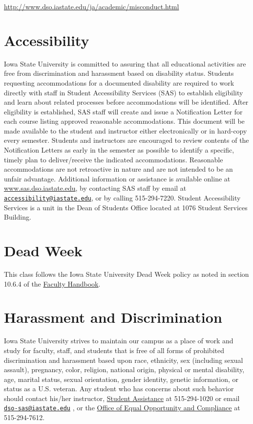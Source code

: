 \documentclass{article}
\begin{document}
\url{http://www.dso.iastate.edu/ja/academic/misconduct.html}

\section{Accessibility}
Iowa State University is committed to assuring that all educational activities
are free from discrimination and harassment based on disability status.
Students requesting accommodations for a documented disability are required to
work directly with staff in Student Accessibility Services (SAS) to establish
eligibility and learn about related processes before accommodations will be
identified.  After eligibility is established, SAS staff will create and issue
a Notification Letter for each course listing approved reasonable
accommodations.  This document will be made available to the student and
instructor either electronically or in hard-copy every semester.  Students and
instructors are encouraged to review contents of the Notification Letters as
early in the semester as possible to identify a specific, timely plan to
deliver/receive the indicated accommodations. Reasonable accommodations are not
retroactive in nature and are not intended to be an unfair advantage.
Additional information or assistance is available online at
\url{www.sas.dso.iastate.edu}, by contacting SAS staff by email at
\href{mailto: accessibility@iastate.edu}{\tt accessibility@iastate.edu}, or by calling 515-294-7220. Student Accessibility Services is a unit in the Dean of Students Office located at 1076 Student Services Building.
\section{Dead Week}
This class follows the Iowa State University Dead Week policy as noted in
section 10.6.4 of the \href{http://www.provost.iastate.edu/resources/faculty-handbook}{Faculty
Handbook}.
\section{Harassment and Discrimination}
Iowa State University strives to maintain our campus as a place of work and study for faculty, staff, and
students that is free of all forms of prohibited discrimination and harassment based upon race, ethnicity,
sex (including sexual assault), pregnancy, color, religion, national origin, physical or mental disability,
age, marital status, sexual orientation, gender identity, genetic information, or status as a U.S. veteran.
Any student who has concerns about such behavior should contact his/her
instructor, \href{https://www.studentassistance.dso.iastate.edu/}{Student Assistance}
at 515-294-1020 or email \href{mailto:
https://www.studentassistance.dso.iastate.edu/}{\tt dso-sas@iastate.edu} ,
or the \href{https://www.eoc.iastate.edu/}{Office of Equal Opportunity and
Compliance} at
515-294-7612.
\end{document}
